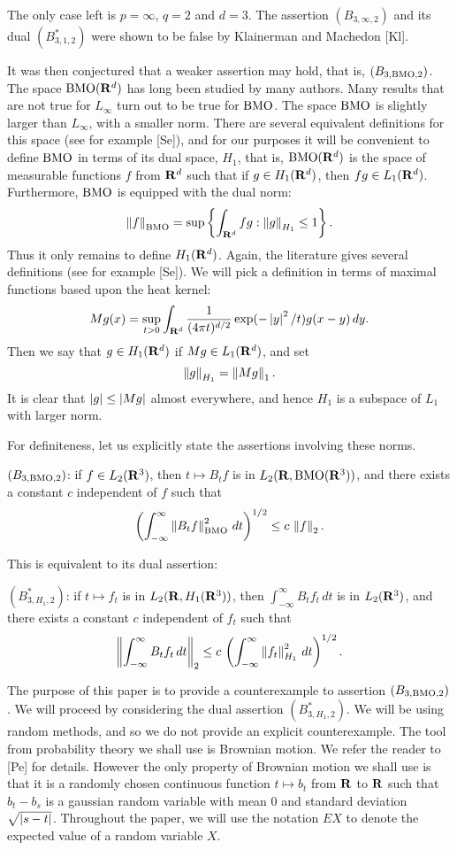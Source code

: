 The only case left is $p=\infty$, $q = 2$ and $d = 3$.  The assertion
$(B_{3,\infty,2})$ and its dual $(B^*_{3,1,2})$ were shown to be false
by Klainerman and Machedon [Kl].

It was then conjectured that a weaker assertion may hold, that is,
$(B_{3,{\rm BMO},2})$.  The
space ${\rm BMO}({\bf R}^d)$ has long been studied by many authors.  Many results
that are not true for $L_\infty$ turn out to be true for ${\rm BMO}$.  The
space ${\rm BMO}$ is slightly larger than $L_\infty$, with a smaller norm.
There are several equivalent definitions for this space (see for example
[Se]), 
and for our
purposes it will be convenient to define ${\rm BMO}$ in terms of its dual space,
$H_1$, that is, ${\rm BMO}({\bf R}^d)$ is the space of measurable functions $f$ from
${\bf R}^d$ such that if $g \in H_1({\bf R}^d)$, then $fg \in L_1({\bf R}^d)$.  Furthermore,
${\rm BMO}$ is equipped with the dual norm:
$$ \left\|f\right\|_{{\rm BMO}} = \sup\left\{ \int_{{\bf R}^d} fg : \left\|g\right\|_{H_1} \le 1
   \right\} .$$
Thus it only remains to define $H_1({\bf R}^d)$.  Again, the literature
gives several definitions (see for example [Se]).  
We will pick a definition in terms of
maximal functions based upon the heat kernel:
$$ Mg(x) = \sup_{t>0} \int_{{\bf R}^d} {1\over (4 \pi t)^{d/2}}
   \exp(-\left|y\right|^2/t) g(x-y) \, dy .$$
Then we say that $g \in H_1({\bf R}^d)$ if $Mg \in L_1({\bf R}^d)$, and set
$$ \left\|g\right\|_{H_1} = \left\|Mg\right\|_1 .$$
It is clear that $\left|g\right| \le \left|Mg\right|$ almost everywhere, and hence
$H_1$ is a subspace of $L_1$ with larger norm.

For definiteness, let us explicitly state the assertions involving these
norms.

\assert $(B_{3,{\rm BMO},2})$:  if $f\in L_2({\bf R}^3)$, then $t\mapsto B_t f$ is in
$L_2({\bf R},{\rm BMO}({\bf R}^3))$, and there exists a constant $c$ independent of
$f$ such that
$$ \left(\int_{-\infty}^\infty \left\|B_t f\right\|_{{\rm BMO}}^2 \, dt \right)^{1/2}
   \le c \, \left\|f\right\|_2 .$$

\noindent This is equivalent to its dual assertion:

\assert $(B^*_{3,H_1,2})$:  if $t\mapsto f_t$ is in $L_2({\bf R},H_1({\bf R}^3))$,
then $\int_{-\infty}^\infty B_t f_t \, dt$ is in $L_2({\bf R}^3)$, and there
exists a constant $c$ independent of $f_t$ such that
$$ \left\|\int_{-\infty}^\infty B_t f_t \, dt\right\|_2 \le c \,
   \left(\int_{-\infty}^\infty \left\|f_t\right\|_{H_1}^2 \, dt \right)^{1/2} .$$

\noindent
The purpose of this paper is to provide a counterexample to assertion
$(B_{3,{\rm BMO},2})$.  We will proceed by considering
the dual assertion $(B^*_{3,H_1,2})$.  We will
be using random methods, and so we do not provide an
explicit counterexample.  The tool from probability theory we shall use
is Brownian motion.  We refer the reader to [Pe] for details.  However
the only property of Brownian motion we shall use is that it is a
randomly chosen continuous function $t\mapsto b_t$ from ${\bf R}$ to ${\bf R}$
such that $b_t - b_s$ is a gaussian random variable with mean 0 and
standard deviation $\sqrt{\left|s-t\right|}$.  
Throughout the paper, we will use the notation $E X$
to denote the expected value of a random variable $X$.

